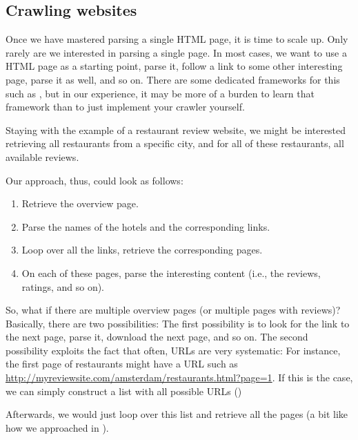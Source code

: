 



\subsection{Crawling websites}
\label{sec:crawling}

Once we have mastered parsing a single HTML page, it is time to scale
up. Only rarely are we interested in parsing a single page. In most
cases, we want to use a HTML page as a starting point, parse it,
follow a link to some other interesting page, parse it as well, and so
on. There are some dedicated frameworks for this such as ,
but in our experience, it may be more of a burden to learn that
framework than to just implement your crawler yourself.

Staying with the example of a restaurant review website, we might be
interested retrieving all restaurants from a specific city, and for
all of these restaurants, all available reviews.

Our approach, thus, could look as follows:

\begin{enumerate}
	\item Retrieve the overview page.
	\item Parse the names of the hotels and the corresponding links.
	\item Loop over all the links, retrieve the corresponding pages.
	\item On each of these pages, parse the interesting content (i.e., the reviews, ratings, and so on).
\end{enumerate}

So, what if there are multiple overview pages (or multiple pages with
reviews)? Basically, there are two possibilities: The first
possibility is to look for the link to the next page, parse it,
download the next page, and so on.  The second possibility exploits
the fact that often, URLs are very systematic: For instance, the first
page of restaurants might have a URL such as
\url{http://myreviewsite.com/amsterdam/restaurants.html?page=1}.  If this
is the case, we can simply construct a list with all possible URLs
()


Afterwards, we would just loop over this list and retrieve all the
pages (a bit like how we approached  in ).

